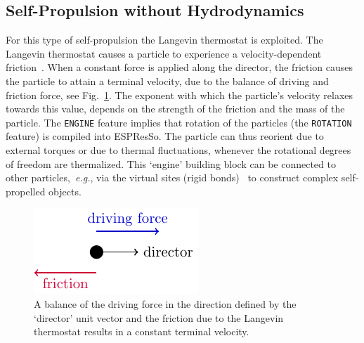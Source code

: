 \documentclass[aip,jcp,reprint,a4paper,onecolumn,amsmath]{revtex4-1}
\newcommand\code{\lstinline}
\newcommand{\es}{\mbox{\textsf{ESPResSo}}\xspace}
\begin{document}
\subsection{\label{sub:langevin}Self-Propulsion without Hydrodynamics}

For this type of self-propulsion the Langevin thermostat is exploited. The Langevin thermostat causes a particle to experience a velocity-dependent friction~\cite{UG}. When a constant force is applied along the director, the friction causes the particle to attain a terminal velocity, due to the balance of driving and friction force, see Fig.~\ref{fig:balance}. The exponent with which the particle's velocity relaxes towards this value, depends on the strength of the friction and the mass of the particle. The \code{ENGINE} feature implies that rotation of the particles (the \code{ROTATION} feature) is compiled into \es{}. The particle can thus reorient due to external torques or due to thermal fluctuations, whenever the rotational degrees of freedom are thermalized. This `engine' building block can be connected to other particles,~\textit{e.g.}, via the virtual sites (rigid bonds)~\cite{UG} to construct complex self-propelled objects\cite{ilse16a}.

\begin{figure}[!htb]
\begin{center}
\includegraphics[scale=1.0]{FIGURES/friction}
\end{center}
\caption{\label{fig:balance}A balance of the driving force in the direction defined by the `director' unit vector and the friction due to the Langevin thermostat results in a constant terminal velocity.}
\end{figure}
\end{document}

